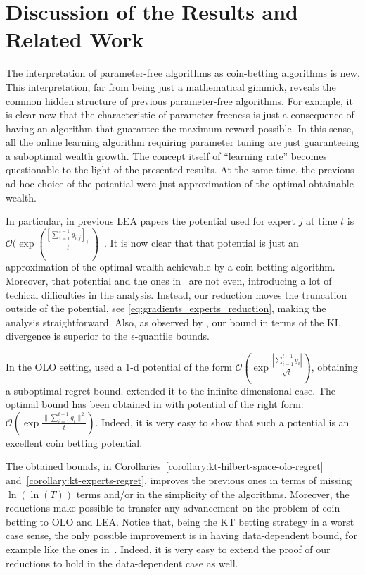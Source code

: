 \section{Discussion of the Results and Related Work}
\label{sec:discussion}

The interpretation of parameter-free algorithms as coin-betting algorithms is
new. This interpretation, far from being just a mathematical gimmick, reveals
the common hidden structure of previous parameter-free algorithms. For example,
it is clear now that the characteristic of parameter-freeness is just a
consequence of having an algorithm that guarantee the maximum reward possible.
In this sense, all the online learning algorithm requiring parameter tuning are
just guaranteeing a suboptimal wealth growth. The concept itself of ``learning rate'' becomes questionable to the light of the presented results.
At the same time, the previous
ad-hoc choice of the potential were just approximation of the optimal obtainable
wealth.

In particular, in previous \ac{LEA} papers the potential used for expert $j$ at time $t$
is $\mathcal{O}(\exp(\frac{[\sum_{i=1}^{t-1} g_{i,j}]_+}{t})$~\citep{ChaudhuriYH09,LuoE14,LuoS15}.
It is now clear that that potential is just an approximation of the optimal wealth achievable by a coin-betting algorithm.
Moreover, that potential and the ones in~\citet{ChernovV10,KoolenE15} are not even, introducing a lot of techical difficulties in the analysis. Instead, our reduction moves the truncation outside of the potential, see \eqref{eq:gradients_experts_reduction}, making the analysis straightforward. Also, as observed by \citet{ChernovV10}, our bound in terms of the KL divergence is superior to the $\epsilon$-quantile bounds.

In the \ac{OLO} setting, \citet{StreeterM12} used a 1-d potential of the form $\mathcal{O}(\exp\frac{|\sum_{i=1}^{t-1} g_{i}|}{\sqrt{t}})$, obtaining a suboptimal regret bound. \citet{Orabona13} extended it to the infinite dimensional case.
The optimal bound has been obtained in \citet{McMahanO14} with potential of the right form: $\mathcal{O}(\exp\frac{\|\sum_{i=1}^{t-1} g_{i}\|^2}{t})$. Indeed, it is very easy to show that such a potential is an excellent coin betting potential.

The obtained bounds, in Corollaries~\ref{corollary:kt-hilbert-space-olo-regret}
and~\ref{corollary:kt-experts-regret}, improves the previous ones in terms of
missing $\ln(\ln(T))$ terms and/or in the simplicity of the algorithms. Moreover, the
reductions make possible to transfer any advancement on the problem of
coin-betting to \ac{OLO} and \ac{LEA}. Notice that, being the \ac{KT} betting
strategy in a worst case sense, the only possible improvement is in having
data-dependent bound, for example like the ones in~\cite{KoolenE15}. Indeed, it
is very easy to extend the proof of our reductions to hold in the data-dependent
case as well.

